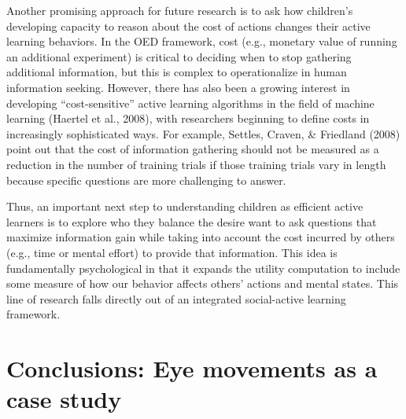 \documentclass[oneside]{report}
\begin{document}
Another promising approach for future research is to ask how children's
developing capacity to reason about the cost of actions changes their
active learning behaviors. In the OED framework, cost (e.g., monetary
value of running an additional experiment) is critical to deciding when
to stop gathering additional information, but this is complex to
operationalize in human information seeking. However, there has also
been a growing interest in developing ``cost-sensitive'' active learning
algorithms in the field of machine learning (Haertel et al., 2008), with
researchers beginning to define costs in increasingly sophisticated
ways. For example, Settles, Craven, \& Friedland (2008) point out that
the cost of information gathering should not be measured as a reduction
in the number of training trials if those training trials vary in length
because specific questions are more challenging to answer.

Thus, an important next step to understanding children as efficient
active learners is to explore who they balance the desire want to ask
questions that maximize information gain while taking into account the
cost incurred by others (e.g., time or mental effort) to provide that
information. This idea is fundamentally psychological in that it expands
the utility computation to include some measure of how our behavior
affects others' actions and mental states. This line of research falls
directly out of an integrated social-active learning framework.

\section{Conclusions: Eye movements as a case
study}\label{conclusions-eye-movements-as-a-case-study}
\end{document}
